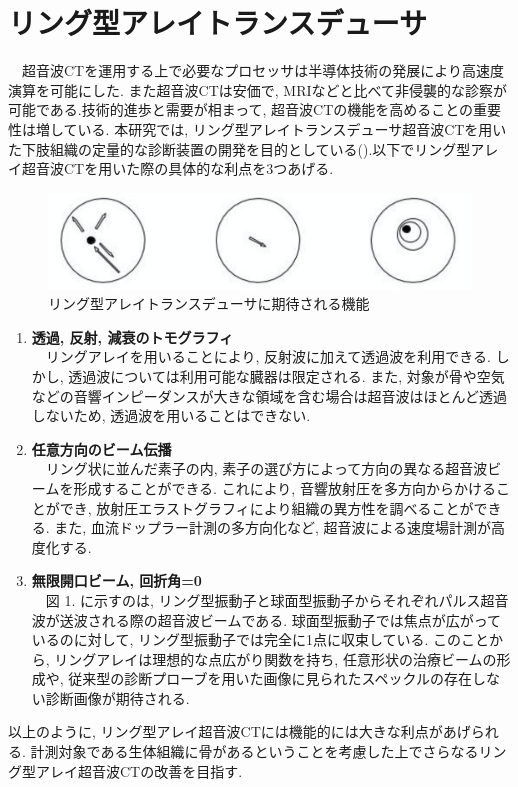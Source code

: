 \section{リング型アレイトランスデューサ} 
　超音波CTを運用する上で必要なプロセッサは半導体技術の発展により高速度演算を可能にした. また超音波CTは安価で, MRIなどと比べて非侵襲的な診察が可能である.技術的進歩と需要が相まって, 超音波CTの機能を高めることの重要性は増している.  本研究では, リング型アレイトランスデューサ超音波CTを用いた下肢組織の定量的な診断装置の開発を目的としている().以下でリング型アレイ超音波CTを用いた際の具体的な利点を3つあげる\cite{senpai}.
\begin{figure}[h]
  \begin{center}
    \includegraphics[width=120mm]{fig/three.pdf}
  \end{center}
  \caption{リング型アレイトランスデューサに期待される機能}
\end{figure}
\begin{enumerate}
\item{\bf 透過, 反射, 減衰のトモグラフィ}
\\\ \ リングアレイを用いることにより, 反射波に加えて透過波を利用できる. しかし, 透過波については利用可能な臓器は限定される. また, 対象が骨や空気などの音響インピーダンスが大きな領域を含む場合は超音波はほとんど透過しないため, 透過波を用いることはできない. 
\item{\bf 任意方向のビーム伝播}
\\\ \ リング状に並んだ素子の内, 素子の選び方によって方向の異なる超音波ビームを形成することができる. これにより, 音響放射圧を多方向からかけることができ, 放射圧エラストグラフィにより組織の異方性を調べることができる. また, 血流ドップラー計測の多方向化など, 超音波による速度場計測が高度化する. 
\item{\bf 無限開口ビーム, 回折角=0}
\\\ \ 図 1. に示すのは, リング型振動子と球面型振動子からそれぞれパルス超音波が送波される際の超音波ビームである. 球面型振動子では焦点が広がっているのに対して, リング型振動子では完全に1点に収束している. このことから, リングアレイは理想的な点広がり関数を持ち, 任意形状の治療ビームの形成や, 従来型の診断プローブを用いた画像に見られたスペックルの存在しない診断画像が期待される. 
\end{enumerate} 
以上のように, リング型アレイ超音波CTには機能的には大きな利点があげられる.  計測対象である生体組織に骨があるということを考慮した上でさらなるリング型アレイ超音波CTの改善を目指す. 

